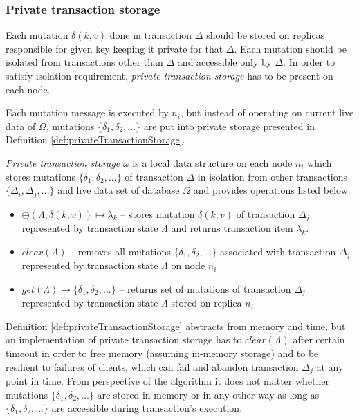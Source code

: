 \documentclass[runningheads,a4paper]{llncs}
\newcommand{\transaction}{$\Delta$\xspace}
\newcommand{\transactionj}{$\Delta_{j}$\xspace}
\newcommand{\transactions}{$\{\Delta_{i}, \Delta_{j}, ...\}$\xspace}
\newcommand{\database}{$\Omega$\xspace}
\newcommand{\mutation}[2]{$\delta(#1, #2)$\xspace}
\newcommand{\mutations}{$\{\delta_{1}, \delta_{2}, ...\}$\xspace}
\newcommand{\txItemi}[1]{$\lambda_{#1}$\xspace}
\newcommand{\txState}{$\Lambda$\xspace}
\newcommand{\txStorage}{$\omega$\xspace}
\newcommand{\node}[1]{$n_{#1}$\xspace}
\begin{document}
\subsubsection{Private transaction storage}
\label{sec:mpp:privateTxStorage}
Each mutation \mutation{k}{v} done in transaction \transaction should be stored on replicas responsible for given key keeping it private for that \transaction. Each mutation should be isolated from transactions other than \transaction and accessible only by \transaction. In order to satisfy isolation requirement, \emph{private transaction storage} has to be present on each node.

Each mutation message is executed by \node{i}, but instead of operating on current live data of \database, mutations \mutations are put into private storage presented in Definition \ref{def:privateTransactionStorage}. 

\begin{definition}
\label{def:privateTransactionStorage}
\emph{Private transaction storage} \txStorage is a local data structure on each node \node{i} which stores mutations \mutations of transaction \transaction in isolation from other transactions \transactions and live data set of database \database and provides operations listed below: 
  \begin{itemize}
    \item $\oplus(\text{\txState}, \text{\mutation{k}{v}}) \mapsto \text{\txItemi{k}}$ -- stores mutation \mutation{k}{v} of transaction \transactionj represented by transaction state \txState and returns transaction item \txItemi{k}. 
    \item $\mathit{clear}(\text{\txState})$ -- removes all mutations \mutations associated with transaction \transactionj represented by transaction state \txState on node \node{i}
    \item $\mathit{get}(\text{\txState}) \mapsto \text{\mutations}$ -- returns set of mutations of transaction \transactionj represented by transaction state \txState stored on replica \node{i} 
  \end{itemize}
\end{definition}

Definition \ref{def:privateTransactionStorage} abstracts from memory and time, but an implementation of private transaction storage has to $\mathit{clear}(\text{\txState})$ after certain timeout in order to free memory (assuming in-memory storage) and to be resilient to failures of clients, which can fail and abandon transaction \transactionj at any point in time. From perspective of the algorithm it does not matter whether mutations \mutations are stored in memory or in any other way as long as \mutations are accessible during transaction's execution. 
\end{document}
